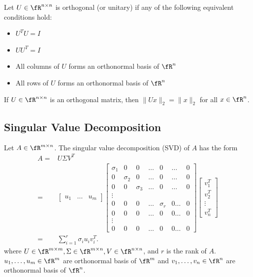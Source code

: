 \documentclass{article}
\begin{document}
\begin{definition}
    Let $U\in\fR^{n\times n}$ is orthogonal (or unitary) if any of the following equivalent conditions hold:
    \begin{itemize}
        \item $U^TU=I$
        \item $UU^T=I$
        \item All columns of $U$ forms an orthonormal basis of $\fR^n$
        \item All rows of $U$ forms an orthonormal basis of $\fR^n$
    \end{itemize}
\end{definition}
If $U\in\fR^{n\times n}$ is an orthogonal matrix, then $\|Ux\|_2 = \|x\|_2$ for all $x\in\fR^n$.

\subsection{Singular Value Decomposition}\label{subsec:SVD}
Let $A\in\fR^{m\times n}$. The singular value decomposition (SVD) of $A$ has the form
\begin{align}
A =& U\Sigma V^T\\
=&\begin{bmatrix}u_1& \dots & u_m\end{bmatrix}
 \begin{bmatrix}
 \sigma_1 & 0 & 0 & \dots & 0 & \dots & 0\\
        0 & \sigma_2 & 0 & \dots & 0 & \dots & 0\\
        0 & 0 & \sigma_3 & \dots & 0 & \dots & 0\\
        \vdots &&&&&&\\
        0 & 0 & 0 & \dots & \sigma_r& 0 \dots & 0\\
        0 & 0 & 0 & \dots & 0  & 0 \dots & 0\\
        \vdots &&&&&&\\
        0 & 0 & 0 & \dots & 0  & 0 \dots & 0
 \end{bmatrix}
  \begin{bmatrix}v_1^T \\ v_2^T\\\vdots \\v_n^T\end{bmatrix}\\
  =& \sum_{i=1}^r \sigma_i u_i v_i^T.
\end{align}
where $U\in\fR^{m\times m}, \Sigma\in\fR^{m\times n}, V\in\fR^{n\times n}$, and $r$ is the rank of $A$.
$u_1, \dots, u_m\in\fR^m$ are orthonormal basis of $\fR^m$ and $v_1, \dots, v_n\in\fR^n$ are orthonormal basis of $\fR^n$.
\end{document}
